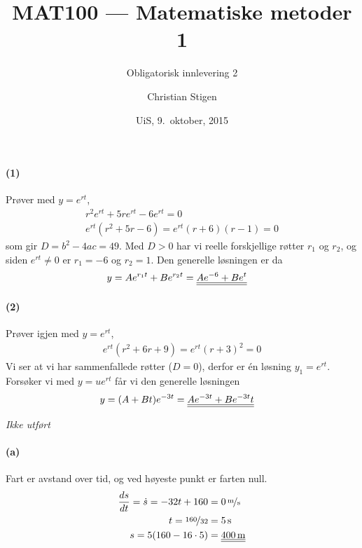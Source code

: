 \documentclass[a4paper,norsk,12pt]{article}
\title{MAT100 --- Matematiske metoder 1}
\subtitle{Obligatorisk innlevering 2}
\author{Christian Stigen}
\date{UiS, 9.~oktober, 2015}
\begin{document}
\maketitle

\paragraph{(1)} Prøver med $y=e^{rt}$,
\begin{equation*}
  \begin{split}
    r^2e^{rt} + 5re^{rt} - 6e^{rt} = 0 \\
    e^{rt}(r^2+5r-6) = e^{rt}(r+6)(r-1) = 0
  \end{split}
\end{equation*}
%
som gir $D = b^2 - 4ac = 49$. Med $D > 0$ har vi reelle forskjellige røtter
$r_1$ og $r_2$, og siden $e^{rt} \neq 0$ er $r_1=-6$ og $r_2=1$. Den generelle
løsningen er da
%
\begin{equation*}
  \begin{split}
    y & = Ae^{r_1t} + Be^{r_2t} = {\underline{\underline{Ae^{-6} + Be^t}}}
  \end{split}
\end{equation*}

\paragraph{(2)} Prøver igjen med $y=e^{rt}$,
\begin{equation*}
  \begin{split}
    e^{rt}(r^2 + 6r + 9) = e^{rt}(r+3)^2 = 0
  \end{split}
\end{equation*}
Vi ser at vi har sammenfallede røtter ($D=0$), derfor er én løsning $y_1 =
e^{rt}$. Forsøker vi med $y = ue^{rt}$ får vi den generelle løsningen
\begin{equation*}
  \begin{split}
    y & = (A + Bt)e^{-3t} = {\underline{\underline{Ae^{-3t} + Be^{-3t}t}}}
  \end{split}
\end{equation*}

\textit{Ikke utført}

\paragraph{(a)}
Fart er avstand over tid, og ved høyeste punkt er farten null.
\begin{equation*}
  \begin{split}
    \frac{ds}{dt} = \dot{s} = -32t + 160 & = \unitfrac[0]{m}{s} \\
    t = \nicefrac{160}{32} & = \unit[5]{s} \\
    s = 5(160-16\cdot5) & = \svar{\unit[400]{m}}
  \end{split}
\end{equation*}
\end{document}
